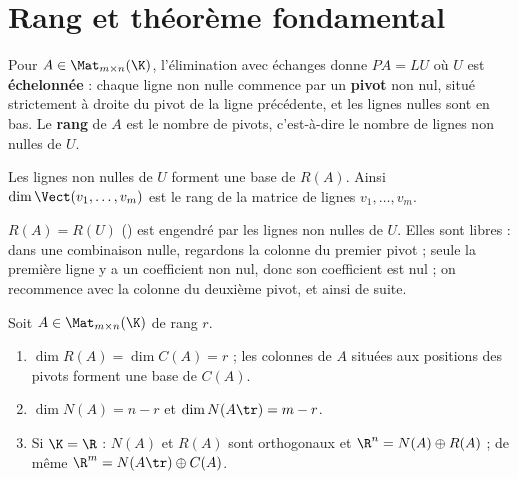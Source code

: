 \section{Rang et théorème fondamental}
\begin{definition}[Rang]
Pour $A\in\Mat_{m\times n}(\K)$, l'élimination avec échanges donne $PA=LU$ où $U$ est \textbf{échelonnée} : chaque ligne non nulle commence par un \textbf{pivot} non nul, situé strictement à droite du pivot de la ligne précédente, et les lignes nulles sont en bas. Le \textbf{rang} de $A$ est le nombre de pivots, c'est-à-dire le nombre de lignes non nulles de $U$.
\end{definition}
\begin{proposition}\label{prop-base-engendre}
Les lignes non nulles de $U$ forment une base de $R(A)$. Ainsi $\dim\Vect(v_1,\dots,v_m)$ est le rang de la matrice de lignes $v_1,\dots,v_m$.
\end{proposition}
\begin{preuve}
$R(A)=R(U)$ () est engendré par les lignes non nulles de $U$. Elles sont libres : dans une combinaison nulle, regardons la colonne du premier pivot ; seule la première ligne y a un coefficient non nul, donc son coefficient est nul ; on recommence avec la colonne du deuxième pivot, et ainsi de suite.
\end{preuve}
\begin{theoreme}\label{thm-fondamental}
Soit $A\in\Mat_{m\times n}(\K)$ de rang $r$.
\begin{enumerate}
\item $\dim R(A)=\dim C(A)=r$ ; les colonnes de $A$ situées aux positions des pivots forment une base de $C(A)$.
\item $\dim N(A)=n-r$ et $\dim N(A\tr)=m-r$.
\item Si $\K=\R$ : $N(A)$ et $R(A)$ sont orthogonaux et $\R^n=N(A)\oplus R(A)$ ; de même $\R^m=N(A\tr)\oplus C(A)$.
\end{enumerate}
\end{theoreme}
